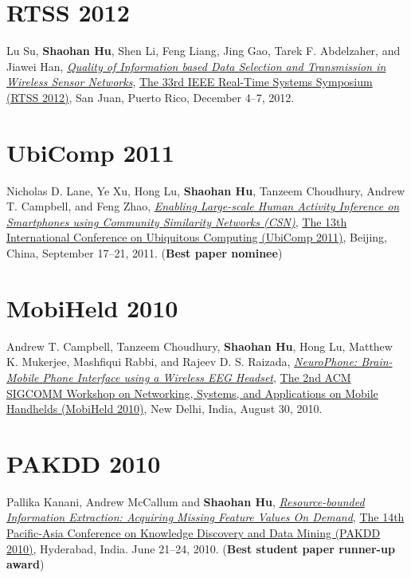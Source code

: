 \section{\sc RTSS 2012}\hypertarget{su2012rtss}{}
Lu Su, \textbf{Shaohan Hu}, Shen Li, Feng Liang, Jing Gao, Tarek F. Abdelzaher, and Jiawei Han,
\href{http://ieeexplore.ieee.org/document/6424815}{\emph{Quality of Information based Data Selection and Transmission in Wireless Sensor Networks}},
\href{http://sites.ieee.org/rtss2012/}{\textsf{The 33rd IEEE Real-Time Systems Symposium (RTSS 2012)}},
San Juan, Puerto Rico, December 4--7, 2012.

\section{\sc UbiComp 2011}\hypertarget{lane2011ubicomp}{}
Nicholas D. Lane, Ye Xu, Hong Lu, \textbf{Shaohan Hu}, Tanzeem Choudhury, Andrew T. Campbell, and Feng Zhao,
\href{http://portal.acm.org/citation.cfm?id=2030160}{\emph{Enabling Large-scale Human Activity Inference on Smartphones using Community Similarity Networks (CSN)}},
\href{http://www.ubicomp.org/ubicomp2011/}{\textsf{The 13th International Conference on Ubiquitous Computing (UbiComp 2011)}},
Beijing, China, September 17--21, 2011. (\textbf{Best paper nominee})

\section{\sc MobiHeld 2010}\hypertarget{campbell2010mobiheld}{}
Andrew T. Campbell, Tanzeem Choudhury, \textbf{Shaohan Hu}, Hong Lu, Matthew K. Mukerjee, Mashfiqui Rabbi, and Rajeev D. S. Raizada,
\href{http://portal.acm.org/citation.cfm?id=1851326}{\emph{NeuroPhone: Brain-Mobile Phone Interface using a Wireless EEG Headset}},
\href{http://conferences.sigcomm.org/sigcomm/2010/mhcfp.php}{\textsf{The 2nd ACM SIGCOMM Workshop on Networking, Systems, and Applications on Mobile Handhelds (MobiHeld 2010)}},
New Delhi, India, August 30, 2010.

\section{\sc PAKDD 2010}\hypertarget{kanani2010pakdd}{}
Pallika Kanani, Andrew McCallum and \textbf{Shaohan Hu},
\href{http://www.springerlink.com/content/j41w758434321108}{\emph{Resource-bounded Information Extraction: Acquiring Missing Feature Values On Demand}},
\href{http://www.iiit.ac.in/conferences/pakdd2010}{\textsf{The 14th Pacific-Asia Conference on Knowledge Discovery and Data Mining (PAKDD 2010)}},
Hyderabad, India. June 21--24, 2010. (\textbf{Best student paper runner-up award})

